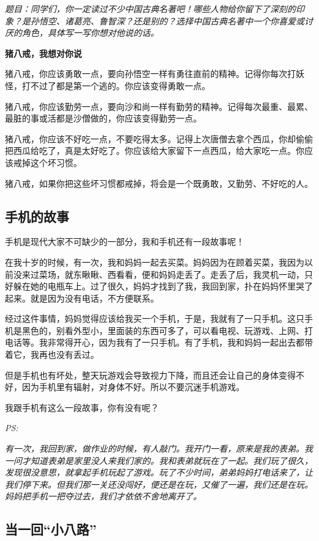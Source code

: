 \documentclass[UTF8,a4paper,titlepage,twoside,10.5pt]{article}
\begin{document}
\emph{题目：同学们，你一定读过不少中国古典名著吧！哪些人物给你留下了深刻的印象？是孙悟空、诸葛亮、鲁智深？还是别的？选择中国古典名著中一个你喜爱或讨厌的角色，具体写一写你想对他说的话。}

\textbf{猪八戒，我想对你说}

猪八戒，你应该勇敢一点，要向孙悟空一样有勇往直前的精神。记得你每次打妖怪，打不过了都是第一个逃的。你应该变得勇敢一点。

猪八戒，你应该勤劳一点，要向沙和尚一样有勤劳的精神。记得每次最重、最累、最脏的事或活都是沙僧做的，你应该变得勤劳一点。

猪八戒，你应该不好吃一点，不要吃得太多。记得上次唐僧去拿个西瓜，你却偷偷把西瓜给吃了，真是太好吃了。你应该给大家留下一点西瓜，给大家吃一点。你应该戒掉这个坏习惯。

猪八戒，如果你把这些坏习惯都戒掉，将会是一个既勇敢，又勤劳、不好吃的人。

\subsection{手机的故事}
\label{sec:org5a12fdf}

手机是现代大家不可缺少的一部分，我和手机还有一段故事呢！

在我十岁的时候，有一次，我和妈妈一起去买菜。妈妈因为在顾着买菜，我因为以前没来过菜场，就东瞅瞅、西看看，便和妈妈走丢了。走丢了后，我灵机一动，只好躲在她的电瓶车上。过了很久，妈妈才找到了我，我回到家，扑在妈妈怀里哭了起来。就是因为没有电话，不方便联系。

经过这件事情，妈妈觉得应该给我买一个手机，于是，我就有了一只手机。这只手机是黑色的，别看外型小，里面装的东西可多了，可以看电视、玩游戏、上网、打电话等。我非常得开心，因为我有了一只手机。有了手机，我和妈妈一起出去都带着它，我再也没有丢过。

但是手机也有坏处，整天玩游戏会导致视力下降，而且还会让自己的身体变得不好，因为手机里有辐射，对身体不好。所以不要沉迷手机游戏。

我跟手机有这么一段故事，你有没有呢？

\emph{PS:}

\emph{有一次，我回到家，做作业的时候，有人敲门。我开门一看，原来是我的表弟。我一问才知道表弟是家里没人来我们家的。我和表弟就玩在了一起。我们玩了很久，发现很没意思，就拿起手机玩起了游戏。玩了不少时间，弟弟妈妈打电话来了，让我们停下来。但我们那一关还没闯好，便还是在玩，又催了一遍，我们还是在玩。妈妈把手机一把夺过去，我们才依依不舍地离开了。}

\subsection{当一回“小八路”}
\label{sec:org147f759}
\end{document}

